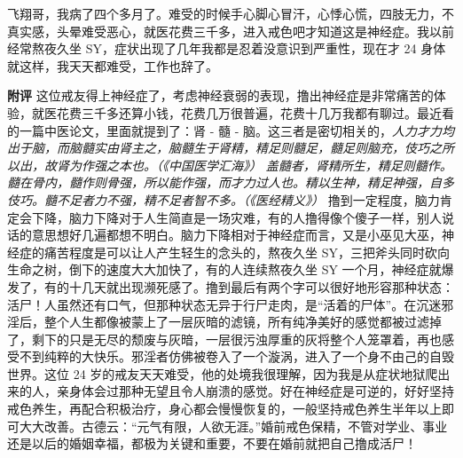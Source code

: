 \begin{case}
    飞翔哥，我病了四个多月了。难受的时候手心脚心冒汗，心悸心慌，四肢无力，不真实感，头晕难受恶心，就医花费三千多，进入戒色吧才知道这是神经症。我以前经常熬夜久坐 SY，症状出现了几年我都是忍着没意识到严重性，现在才 24 身体就这样，我天天都难受，工作也辞了。

    \textbf{附评} 这位戒友得上神经症了，考虑神经衰弱的表现，撸出神经症是非常痛苦的体验，就医花费三千多还算小钱，花费几万很普遍，花费十几万我都有聊过。最近看的一篇中医论文，里面就提到了：肾 - 髓 - 脑。这三者是密切相关的，\textit{人力才力均出于脑，而脑髓实由肾主之，脑髓生于肾精，精足则髓足，髓足则脑充，伎巧之所以出，故肾为作强之本也。（《中国医学汇海》）} \textit{盖髓者，肾精所生，精足则髓作。髓在骨内，髓作则骨强，所以能作强，而才力过人也。精以生神，精足神强，自多伎巧。髓不足者力不强，精不足者智不多。（《医经精义》）} 撸到一定程度，脑力肯定会下降，脑力下降对于人生简直是一场灾难，有的人撸得像个傻子一样，别人说话的意思想好几遍都想不明白。脑力下降相对于神经症而言，又是小巫见大巫，神经症的痛苦程度是可以让人产生轻生的念头的，熬夜久坐 SY，三把斧头同时砍向生命之树，倒下的速度大大加快了，有的人连续熬夜久坐 SY 一个月，神经症就爆发了，有的十几天就出现濒死感了。撸到最后有两个字可以很好地形容那种状态：活尸！人虽然还有口气，但那种状态无异于行尸走肉，是“活着的尸体”。在沉迷邪淫后，整个人生都像被蒙上了一层灰暗的滤镜，所有纯净美好的感觉都被过滤掉了，剩下的只是无尽的颓废与灰暗，一层很污浊厚重的灰将整个人笼罩着，再也感受不到纯粹的大快乐。邪淫者仿佛被卷入了一个漩涡，进入了一个身不由己的自毁世界。这位 24 岁的戒友天天难受，他的处境我很理解，因为我是从症状地狱爬出来的人，亲身体会过那种无望且令人崩溃的感觉。好在神经症是可逆的，好好坚持戒色养生，再配合积极治疗，身心都会慢慢恢复的，一般坚持戒色养生半年以上即可大大改善。古德云：“元气有限，人欲无涯。”婚前戒色保精，不管对学业、事业还是以后的婚姻幸福，都极为关键和重要，不要在婚前就把自己撸成活尸！
\end{case}

